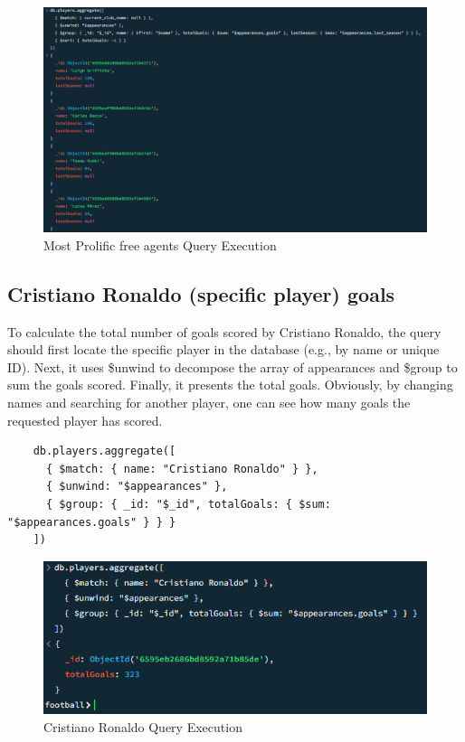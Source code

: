 \documentclass{Configuration_Files/PoliMi3i_thesis}
\begin{document}
\begin{figure}[htbp]
    \centering
    \includegraphics[scale=0.7]{Images/Queries/Most_prolific_free_agents/mpfa.png}
    \caption{Most Prolific free agents Query Execution}
\end{figure}


\subsection{Cristiano Ronaldo (specific player) goals }
To calculate the total number of goals scored by Cristiano Ronaldo, the query should first locate the specific player in the database (e.g., by name or unique ID). Next, it uses \$unwind to decompose the array of appearances and \$group to sum the goals scored. Finally, it presents the total goals.
Obviously, by changing names and searching for another player, one can see how many goals the requested player has scored.
\begin{verbatim}
    db.players.aggregate([
      { $match: { name: "Cristiano Ronaldo" } },
      { $unwind: "$appearances" },
      { $group: { _id: "$_id", totalGoals: { $sum: "$appearances.goals" } } }
    ])
\end{verbatim}
\begin{figure}[htbp]
    \centering
    \includegraphics[scale=1]{Images/Queries/Cristiano_Ronaldo_goals/CRG.png}
    \caption{Cristiano Ronaldo Query Execution}
\end{figure}
\newpage
\end{document}

